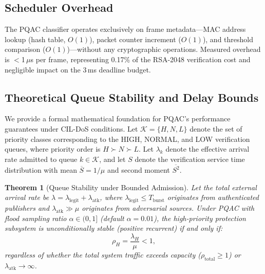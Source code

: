\documentclass{ieeeaccess}
\begin{document}
\subsection{Scheduler Overhead}
The PQAC classifier operates exclusively on frame metadata---MAC address lookup (hash table, $O(1)$), packet counter increment ($O(1)$), and threshold comparison ($O(1)$)---without any cryptographic operations. Measured overhead is $<$1\,$\mu$s per frame, representing 0.17\% of the RSA-2048 verification cost and negligible impact on the 3\,ms deadline budget.

\subsection{Theoretical Queue Stability and Delay Bounds}
\label{sec:pqac_theory}
We provide a formal mathematical foundation for PQAC's performance guarantees under CIL-DoS conditions. Let $\mathcal{K} = \{H, N, L\}$ denote the set of priority classes corresponding to the HIGH, NORMAL, and LOW verification queues, where priority order is $H \succ N \succ L$. Let $\lambda_k$ denote the effective arrival rate admitted to queue $k \in \mathcal{K}$, and let $S$ denote the verification service time distribution with mean $\overline{S} = 1/\mu$ and second moment $\overline{S^2}$.

\newtheorem{theorem}{Theorem}
\newtheorem{lemma}{Lemma}
\providecommand{\IEEEQED}{\hfill$\blacksquare$}
\ifdefined\proof\else
\newenvironment{proof}{\noindent\textit{Proof:}\enspace}{\IEEEQED\medskip}
\fi

\begin{theorem}[Queue Stability under Bounded Admission]
\label{thm:stability}
Let the total external arrival rate be $\lambda = \lambda_{\text{legit}} + \lambda_{\text{atk}}$, where $\lambda_{\text{legit}} \le T_{\text{burst}}$ originates from authenticated publishers and $\lambda_{\text{atk}} \gg \mu$ originates from adversarial sources. Under PQAC with flood sampling ratio $\alpha \in (0, 1]$ (default $\alpha = 0.01$), the high-priority protection subsystem is unconditionally stable (positive recurrent) if and only if:
\begin{equation}
\rho_H = \frac{\lambda_H}{\mu} < 1,
\end{equation}
regardless of whether the total system traffic exceeds capacity ($\rho_{\text{total}} \ge 1$) or $\lambda_{\text{atk}} \to \infty$.
\end{theorem}
\end{document}
